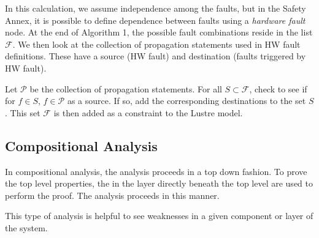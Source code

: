In this calculation, we assume independence among the faults, but in the Safety Annex, it is possible to define dependence between faults using a \textit{hardware fault} node. At the end of Algorithm 1, the possible fault combinations reside in the list $\mathcal{F}$. We then look at the collection of propagation statements used in HW fault definitions. These have a source (HW fault) and destination (faults triggered by HW fault). 

Let $\mathcal{P}$ be the collection of propagation statements. For all $S \subset \mathcal{F}$, check to see if for $f \in S$, $f \in \mathcal{P}$ as a source. If so, add the corresponding destinations to the set $S$. This set $\mathcal{F}$ is then added as a constraint to the Lustre model. 


\subsection{Compositional Analysis}
In compositional analysis, the analysis proceeds in a top down fashion. To prove the top level properties, the %
 in the layer directly beneath the top level are used to perform the proof. The analysis proceeds in this manner. %

 
 This type of analysis is helpful to see weaknesses in a given component or layer of the system. %


